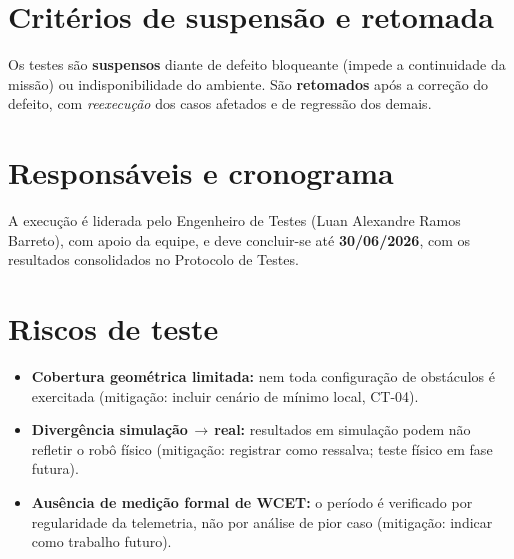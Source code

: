 \section{Critérios de suspensão e retomada}
Os testes são \textbf{suspensos} diante de defeito bloqueante (impede a continuidade da missão) ou indisponibilidade do ambiente. São \textbf{retomados} após a correção do defeito, com \emph{reexecução} dos casos afetados e de regressão dos demais.

\section{Responsáveis e cronograma}
A execução é liderada pelo Engenheiro de Testes (Luan Alexandre Ramos Barreto), com apoio da equipe, e deve concluir-se até \textbf{30/06/2026}, com os resultados consolidados no Protocolo de Testes.

\section{Riscos de teste}
\begin{itemize}[noitemsep,topsep=2pt]
  \item \textbf{Cobertura geométrica limitada:} nem toda configuração de obstáculos é exercitada (mitigação: incluir cenário de mínimo local, CT-04).
  \item \textbf{Divergência simulação\,$\to$\,real:} resultados em simulação podem não refletir o robô físico (mitigação: registrar como ressalva; teste físico em fase futura).
  \item \textbf{Ausência de medição formal de WCET:} o período é verificado por regularidade da telemetria, não por análise de pior caso (mitigação: indicar como trabalho futuro).
\end{itemize}


